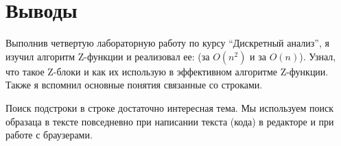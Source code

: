 \section{Выводы}

Выполнив четвертую лабораторную работу по курсу \enquote{Дискретный анализ}, 
я изучил алгоритм Z-функции  и реализовал ее: (за $O(n^2)$ и за $O(n)$). Узнал, что такое Z-блоки и как их
использую в эффективном алгоритме Z-функции.
Также я вспомнил основные понятия связанные со строками. 

Поиск подстроки в строке достаточно интересная тема. Мы используем поиск образаца в тексте повседневно при написании
текста (кода) в редакторе и при работе с браузерами.
\pagebreak